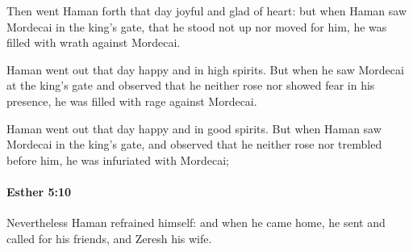 			\begin{versebox}
					\item[BHS] 
					\item[LXX] 
					\item[ASV] Then went Haman forth that day joyful and glad of heart: but when Haman saw Mordecai in the king's gate, that he stood not up nor moved for him, he was filled with wrath against Mordecai.
					\item[NIV] Haman went out that day happy and in high spirits. But when he saw Mordecai at the king’s gate and observed that he neither rose nor showed fear in his presence, he was filled with rage against Mordecai.
					\item[NRSV] Haman went out that day happy and in good spirits. But when Haman saw Mordecai in the king’s gate, and observed that he neither rose nor trembled before him, he was infuriated with Mordecai;
			\end{versebox}

		\paragraph{Esther 5:10} %
			\label{ESTHER-5-10}

			Nevertheless Haman refrained himself: and when he came home, he sent and called for his friends, and Zeresh his wife.

